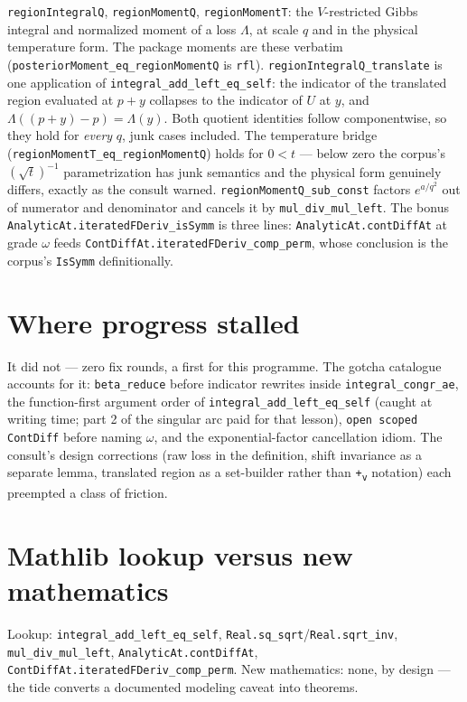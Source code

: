 \documentclass[11pt]{article}
\newcommand{\code}[1]{\texttt{#1}}
\begin{document}
\begin{sloppypar}
\code{regionIntegralQ}, \code{regionMomentQ}, \code{regionMomentT}:
the $V$-restricted Gibbs integral and normalized moment of a loss
$\Lambda$, at scale $q$ and in the physical temperature form. The
package moments are these verbatim
(\code{posteriorMoment\_eq\_regionMomentQ} is \code{rfl}).
\code{regionIntegralQ\_translate} is one application of
\code{integral\_add\_left\_eq\_self}: the indicator of the translated
region evaluated at $p + y$ collapses to the indicator of $U$ at $y$,
and $\Lambda((p+y)-p) = \Lambda(y)$. Both quotient identities follow
componentwise, so they hold for \emph{every} $q$, junk cases
included. The temperature bridge
(\code{regionMomentT\_eq\_regionMomentQ}) holds for $0 < t$ --- below
zero the corpus's $(\sqrt{t})^{-1}$ parametrization has junk
semantics and the physical form genuinely differs, exactly as the
consult warned. \code{regionMomentQ\_sub\_const} factors
$e^{a/q^2}$ out of numerator and denominator and cancels it by
\code{mul\_div\_mul\_left}. The bonus
\code{AnalyticAt.iteratedFDeriv\_isSymm} is three lines:
\code{AnalyticAt.contDiffAt} at grade $\omega$ feeds
\code{ContDiffAt.iteratedFDeriv\_comp\_perm}, whose conclusion is the
corpus's \code{IsSymm} definitionally.
\end{sloppypar}

\section{Where progress stalled}

It did not --- zero fix rounds, a first for this programme. The
gotcha catalogue accounts for it: \code{beta\_reduce} before
indicator rewrites inside \code{integral\_congr\_ae}, the
function-first argument order of \code{integral\_add\_left\_eq\_self}
(caught at writing time; part 2 of the singular arc paid for that
lesson), \code{open scoped ContDiff} before naming $\omega$, and the
exponential-factor cancellation idiom. The consult's design
corrections (raw loss in the definition, shift invariance as a
separate lemma, translated region as a set-builder rather than
\code{+\textsubscript{v}} notation) each preempted a class of
friction.

\section{Mathlib lookup versus new mathematics}

\begin{sloppypar}
Lookup: \code{integral\_add\_left\_eq\_self},
\code{Real.sq\_sqrt}/\code{Real.sqrt\_inv},
\code{mul\_div\_mul\_left}, \code{AnalyticAt.contDiffAt},
\code{ContDiffAt.iteratedFDeriv\_comp\_perm}. New mathematics: none,
by design --- the tide converts a documented modeling caveat into
theorems.
\end{sloppypar}
\end{document}
